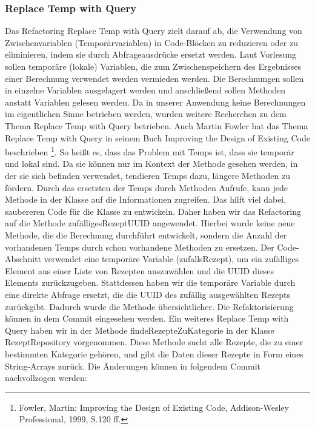 \subsubsection{Replace Temp with Query}
Das Refactoring Replace Temp with Query zielt darauf ab, die Verwendung von Zwischenvariablen (Temporärvariablen) in Code-Blöcken zu reduzieren oder zu eliminieren, indem sie durch Abfrageausdrücke ersetzt werden. 
Laut Vorlesung sollen temporäre (lokale) Variablen, die zum Zwischenspeichern des Ergebnisses einer Berechnung verwendet werden vermieden werden. Die Berechnungen sollen in einzelne Variablen ausgelagert werden und anschließend sollen Methoden anstatt Variablen gelesen werden. 
Da in unserer Anwendung keine Berechnungen im eigentlichen Sinne betrieben werden, wurden weitere Recherchen zu dem Thema Replace Temp with Query betrieben. Auch Martin Fowler hat das Thema Replace Temp with Query in seinem Buch \glqq Improving the Design of Existing Code \grqq{} beschrieben \footnote[1]{Fowler, Martin: Improving the Design of Existing Code, Addison-Wesley Professional, 1999, S.120 ff.}. So heißt es, dass das Problem mit Temps ist, dass sie temporär und lokal sind. Da sie können nur im Kontext der Methode gesehen werden, in der sie sich befinden verwendet, tendieren Temps dazu, längere Methoden zu fördern. Durch das ersetzten der Temps durch Methoden Aufrufe, kann jede Methode in der Klasse auf die Informationen zugreifen. Das hilft viel dabei, saubereren Code für die Klasse zu entwickeln.
Daher haben wir das Refactoring auf die Methode zufälligesRezeptUUID angewendet. Hierbei wurde keine neue Methode, die die Berechnung durchführt entwickelt, sondern die Anzahl der vorhandenen Temps durch schon vorhandene Methoden zu ersetzen. Der Code-Abschnitt verwendet eine temporäre Variable (zufallsRezept), um ein zufälliges Element aus einer Liste von Rezepten auszuwählen und die UUID dieses Elements zurückzugeben. Stattdessen haben wir die temporäre Variable durch eine direkte Abfrage ersetzt, die die UUID des zufällig ausgewählten Rezepts zurückgibt. Dadurch wurde die Methode übersichtlicher. Die Refaktorisierung können in dem Commit \href{https://github.com/MichaelaHaag/RezeptApp/commit/4e0bedc859ba644d448fe4c89a3a6e1320519593}{} eingesehen werden. 
Ein weiteres Replace Temp with Query haben wir in der Methode findeRezepteZuKategorie in der Klasse RezeptRepository vorgenommen. Diese Methode sucht alle Rezepte, die zu einer bestimmten Kategorie gehören, und gibt die Daten dieser Rezepte in Form eines String-Arrays zurück. Die Änderungen können in folgendem Commit nachvollzogen werden: 
